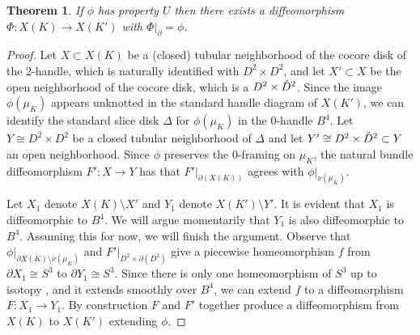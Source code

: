 \documentclass [11pt]{amsart}
\newtheorem {theorem}{Theorem}[section]
\theoremstyle{remark}
\newtheorem {remark}[theorem]{Remark}
\newcommand\intD{\smash{\mathring{D}^2}}
\begin{document}
\begin{theorem}\label{thm:propU}
If $\phi$ has property $U$ then there exists a diffeomorphism $\Phi:X(K)\to X(K')$ with $\Phi|_\partial=\phi$. 
\end{theorem}

\begin{proof}
Let $X\subset X(K)$ be a (closed) tubular neighborhood of the cocore disk of the 2-handle, which is naturally identified with $D^2\times D^2$, and let $X'\subset X$ be the open neighborhood of the cocore disk, which is a $D^2\times \intD$. Since the image $\phi(\mu_K)$ appears unknotted in the standard handle diagram of $X(K')$, we can identify the standard slice disk $\Delta$ for $\phi(\mu_K)$ in the $0$-handle $B^4$. Let $Y\cong D^2\times D^2$ be a closed tubular neighborhood of $\Delta$ and let $Y'\cong D^2\times \intD \subset Y$ an open neighborhood. Since $\phi$ preserves the 0-framing on $\mu_K$, the natural bundle diffeomorphism $F':X\to Y$ has that $F'|_{\partial(X(K))}$ agrees with $\phi|_{\nu(\mu_K)}$. 

Let $X_1$ denote $X(K)\setminus X'$ and $Y_1$ denote $X(K')\setminus Y'$. It is evident that $X_1$ is diffeomorphic to $B^4$. We will argue momentarily that $Y_1$ is also diffeomorphic to $B^4$. Assuming this for now, we will finish the argument. Observe that $\phi|_{\partial X(K)\setminus \nu(\mu_K)}$ and $F'|_{D^2\times\partial(D^2)}$ give a piecewise homeomorphism $f$ from $\partial X_1\cong S^3$ to $\partial Y_1 \cong S^3$. Since there is only one homeomorphism of $S^3$ up to isotopy \cite{Cerf}, and it extends smoothly over $B^4$, we can extend $f$ to a diffeomorphism $F:X_1\to Y_1$. By construction $F$ and $F'$ together produce a  diffeomorphism from $X(K)$ to $X(K')$ extending $\phi$. 


\end{proof}
\end{document}
